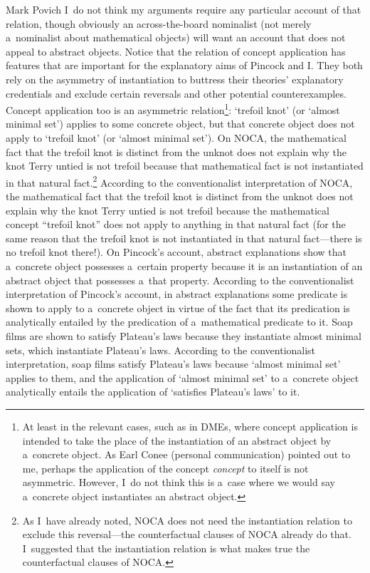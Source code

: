 \begin{artengenv}{Mark Povich}
{ I~do not think my arguments require any particular account of that relation, though obviously an across-the-board nominalist (not merely a~nominalist about mathematical objects) will want an account that does not appeal to abstract objects.} Notice that the relation of concept application has features that are important for the explanatory aims of Pincock and I. They both rely on the asymmetry of instantiation to buttress their theories' explanatory credentials and exclude certain reversals and other potential counterexamples. Concept application too is an asymmetric relation\footnote{At least in the relevant cases, such as in DMEs, where concept application is intended to take the place of the instantiation of an abstract object by a~concrete object. As Earl Conee (personal communication) pointed out to me, perhaps the application of the concept \textit{concept} to itself is not asymmetric. However, I~do not think this is a~case where we would say a~concrete object instantiates an abstract object.}: ‘trefoil knot' (or ‘almost minimal set') applies to some concrete object, but that concrete object does not apply to ‘trefoil knot' (or ‘almost minimal set'). On NOCA, the mathematical fact that the trefoil knot is distinct from the unknot does not explain why the knot Terry untied is not trefoil because that mathematical fact is not instantiated in that natural fact.\footnote{As I~have already noted, NOCA does not need the instantiation relation to exclude this reversal---the counterfactual clauses of NOCA already do that. I~suggested that the instantiation relation is what makes true the counterfactual clauses of NOCA.} According to the conventionalist interpretation of NOCA, the mathematical fact that the trefoil knot is distinct from the unknot does not explain why the knot Terry untied is not trefoil because the mathematical concept ``trefoil knot'' does not apply to anything in that natural fact (for the same reason that the trefoil knot is not instantiated in that natural fact---there is no trefoil knot there!). On Pincock's account, abstract explanations show that a~concrete object possesses a~certain property because it is an instantiation of an abstract object that possesses a~that property. According to the conventionalist interpretation of Pincock's account, in abstract explanations some predicate is shown to apply to a~concrete object in virtue of the fact that its predication is analytically entailed by the predication of a~mathematical predicate to it. Soap films are shown to satisfy Plateau's laws because they instantiate almost minimal sets, which instantiate Plateau's laws. According to the conventionalist interpretation, soap films satisfy Plateau's laws because ‘almost minimal set' applies to them, and the application of ‘almost minimal set' to a~concrete object analytically entails the application of ‘satisfies Plateau's laws' to it.


\end{artengenv}

